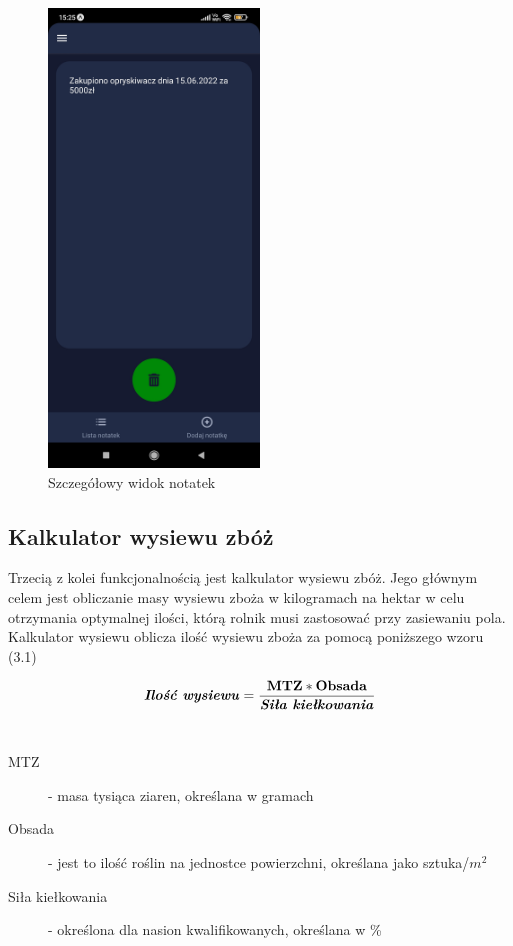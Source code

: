\documentclass[a4paper,12pt,oneside]{book}
\begin{document}
	\begin{figure}[H]
		\centering
		\includegraphics[width=0.5\textwidth]{grafika/notatki_c.jpg}
		\caption{Szczegółowy widok notatek}
	\end{figure}
	
	\subsection{Kalkulator wysiewu zbóż}
		Trzecią z kolei funkcjonalnością jest kalkulator wysiewu zbóż. Jego głównym celem jest obliczanie masy wysiewu zboża w kilogramach na hektar w celu otrzymania optymalnej ilości, którą rolnik musi zastosować przy zasiewaniu pola. Kalkulator wysiewu oblicza ilość wysiewu zboża za pomocą poniższego wzoru (3.1)
		
	\begin{equation}
		\textrm{\textbf{\textit{Ilość wysiewu}}} = \frac{\textbf{MTZ}*\textbf{Obsada}}{\textrm{\textit{\textbf{Siła kiełkowania}}}}
	\end{equation}
	\\
	\begin{description}
		\item[MTZ] - masa tysiąca ziaren, określana w gramach
		\item[Obsada] - jest to ilość roślin na jednostce powierzchni, określana jako sztuka/$ m^{2} $ 
		\item[Siła kiełkowania] - określona dla nasion kwalifikowanych, określana w \% 
	\end{description}
	
\end{document}
